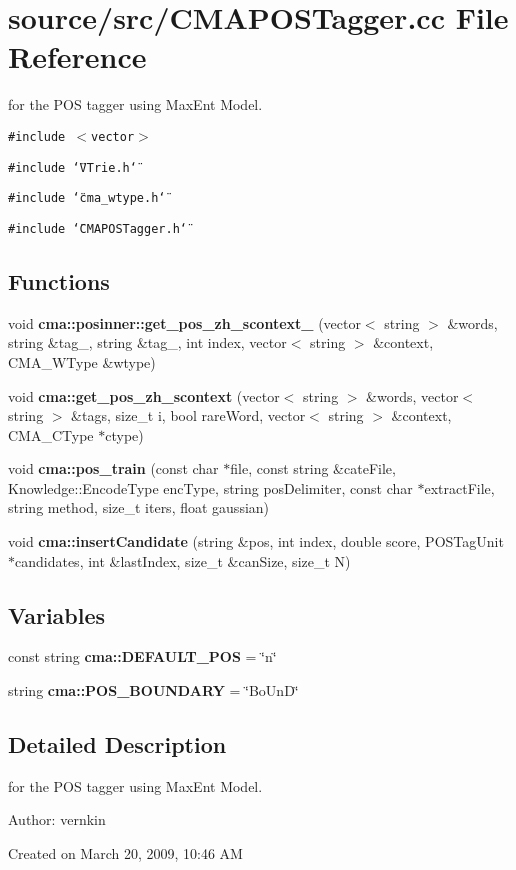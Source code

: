 \section{source/src/CMAPOSTagger.cc File Reference}
\label{CMAPOSTagger_8cc}
for the POS tagger using MaxEnt Model.  


{\tt \#include $<$vector$>$}\par
{\tt \#include \char`\"{}VTrie.h\char`\"{}}\par
{\tt \#include \char`\"{}cma\_\-wtype.h\char`\"{}}\par
{\tt \#include \char`\"{}CMAPOSTagger.h\char`\"{}}\par
\subsection*{Functions}
\begin{CompactItemize}
\item 
void \textbf{cma::posinner::get\_\-pos\_\-zh\_\-scontext\_} (vector$<$ string $>$ \&words, string \&tag\_, string \&tag\_, int index, vector$<$ string $>$ \&context, CMA\_\-WType \&wtype)\label{namespacecma_1_1posinner_f49e6c147898b0b7d3e88af33c64e8f1}

\item 
void {\bf cma::get\_\-pos\_\-zh\_\-scontext} (vector$<$ string $>$ \&words, vector$<$ string $>$ \&tags, size\_\-t i, bool rareWord, vector$<$ string $>$ \&context, CMA\_\-CType $\ast$ctype)
\item 
void {\bf cma::pos\_\-train} (const char $\ast$file, const string \&cateFile, Knowledge::EncodeType encType, string posDelimiter, const char $\ast$extractFile, string method, size\_\-t iters, float gaussian)
\item 
void \textbf{cma::insertCandidate} (string \&pos, int index, double score, POSTagUnit $\ast$candidates, int \&lastIndex, size\_\-t \&canSize, size\_\-t N)\label{namespacecma_dbf7620e7e9b8dd78dbcb87e648fa8ae}

\end{CompactItemize}
\subsection*{Variables}
\begin{CompactItemize}
\item 
const string \textbf{cma::DEFAULT\_\-POS} = \char`\"{}n\char`\"{}\label{namespacecma_04d12652e76d2d5baa4c07f09fa9b639}

\item 
string \textbf{cma::POS\_\-BOUNDARY} = \char`\"{}BoUnD\char`\"{}\label{namespacecma_6d33cf1fe0a06dac555f3a85fec6c4a6}

\end{CompactItemize}


\subsection{Detailed Description}
for the POS tagger using MaxEnt Model. 

\begin{Desc}
\item[Author:]vernkin\end{Desc}
Created on March 20, 2009, 10:46 AM 